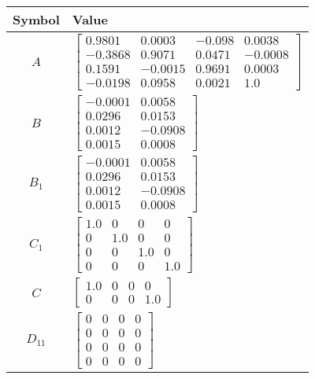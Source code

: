 \begin{tabular}{cl}
\hline
  Symbol  & Value                                                                                                                                                                                \\
\hline
   $A$    & $\left[\begin{matrix}0.9801 & 0.0003 & -0.098 & 0.0038\\-0.3868 & 0.9071 & 0.0471 & -0.0008\\0.1591 & -0.0015 & 0.9691 & 0.0003\\-0.0198 & 0.0958 & 0.0021 & 1.0\end{matrix}\right]$ \\
   $B$    & $\left[\begin{matrix}-0.0001 & 0.0058\\0.0296 & 0.0153\\0.0012 & -0.0908\\0.0015 & 0.0008\end{matrix}\right]$                                                                        \\
 $B_{1}$  & $\left[\begin{matrix}-0.0001 & 0.0058\\0.0296 & 0.0153\\0.0012 & -0.0908\\0.0015 & 0.0008\end{matrix}\right]$                                                                        \\
 $C_{1}$  & $\left[\begin{matrix}1.0 & 0 & 0 & 0\\0 & 1.0 & 0 & 0\\0 & 0 & 1.0 & 0\\0 & 0 & 0 & 1.0\end{matrix}\right]$                                                                          \\
   $C$    & $\left[\begin{matrix}1.0 & 0 & 0 & 0\\0 & 0 & 0 & 1.0\end{matrix}\right]$                                                                                                            \\
 $D_{11}$ & $\left[\begin{matrix}0 & 0 & 0 & 0\\0 & 0 & 0 & 0\\0 & 0 & 0 & 0\\0 & 0 & 0 & 0\end{matrix}\right]$                                                                                  \\

\end{tabular}

